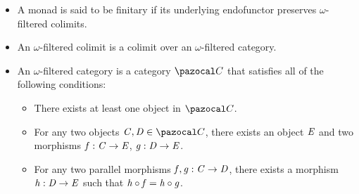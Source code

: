 \begin{itemize}
    \item A monad is said to be finitary if its underlying endofunctor preserves $\omega$-filtered colimits.
    \item An $\omega$-filtered colimit is a colimit over an $\omega$-filtered category.
    \item An $\omega$-filtered category is a category $\mcatC$ that satisfies all of the following conditions: 
        \begin{itemize}
            \item There exists at least one object in $\mcatC$.
            \item For any two objects $\vC, \vD \in \mcatC$, there exists an object $\mathit{E}$ and two morphisms $\mathit{f} : \mathit{C} \to \mathit{E}$, $\mathit{g} : \mathit{D} \to \mathit{E}$.
            \item For any two parallel morphisms $\mathit{f},\mathit{g} : \mathit{C} \to \mathit{D}$, there exists a morphism $\mathit{h} : \mathit{D} \to \mathit{E}$ such that $\mathit{h} \circ \mathit{f} = \mathit{h} \circ \mathit{g}$.
        \end{itemize}
\end{itemize}

